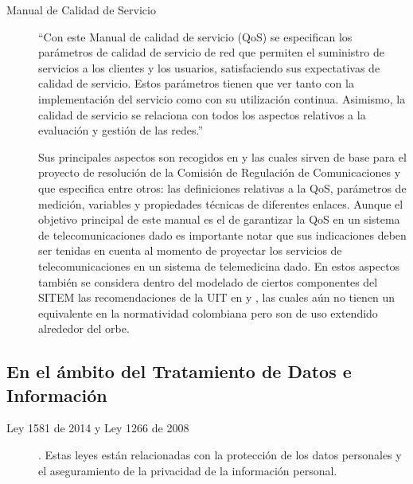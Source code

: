 \begin{description}
\item [Manual de Calidad de Servicio] “Con este Manual de calidad de servicio (QoS) se especifican los parámetros de calidad de servicio de red que permiten el suministro de servicios a los clientes y los usuarios, satisfaciendo sus expectativas de calidad de servicio. Estos parámetros tienen que ver tanto con la implementación del servicio como con su utilización continua. Asimismo, la calidad de servicio se relaciona con todos los aspectos relativos a la evaluación y gestión de las redes.”\cite{ITU2004}

Sus principales aspectos son recogidos en \cite{crtcondiciones} y \cite{crtindicadores}  las cuales sirven de base para el proyecto de resolución\cite{crtqos} de la Comisión de Regulación de Comunicaciones y que especifica entre otros: las definiciones relativas a la QoS, parámetros de medición, variables y propiedades técnicas de diferentes enlaces. Aunque el objetivo principal de este manual es el de garantizar la QoS en un sistema de telecomunicaciones dado es importante notar que sus indicaciones deben ser tenidas en cuenta al momento de proyectar los servicios de telecomunicaciones en un sistema de telemedicina dado. En estos aspectos también se considera dentro del modelado de ciertos componentes del SITEM las recomendaciones de la UIT en \cite{ITUG1000} y \cite{ITUG1010}, las cuales aún no tienen un equivalente en la normatividad colombiana pero son de uso extendido alrededor del orbe.


\end{description}

\subsection{En el ámbito del Tratamiento de Datos e Información}  

\begin{description}
 \item[Ley 1581 de 2014 y Ley 1266 de 2008]. Estas leyes están relacionadas con la protección de los datos personales y el aseguramiento de la privacidad de la información personal.
 
\end{description}